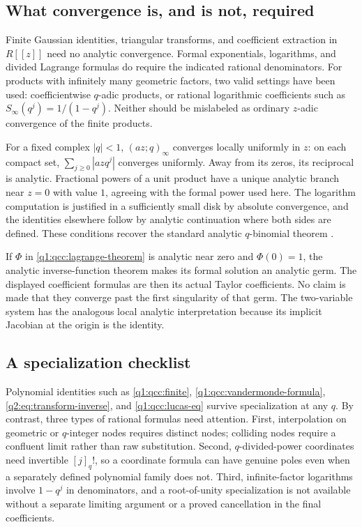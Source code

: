 \documentclass[11pt,a4paper,oneside,openany]{book}
\theoremstyle{definition}
\theoremstyle{remark}
\newcommand{\qf}[2][q]{[#2]_{#1}!}
\newcommand{\poch}[3]{(#1;#2)_{#3}}
\begin{document}
\subsection{What convergence is, and is not, required}
Finite Gaussian identities, triangular transforms, and coefficient extraction in
$R[[z]]$ need no analytic convergence. Formal exponentials, logarithms, and divided
Lagrange formulas do require the indicated rational denominators. For products
with infinitely many geometric factors, two valid settings have been used:
coefficientwise $q$-adic products, or rational logarithmic coefficients such as
$S_\infty(q^j)=1/(1-q^j)$. Neither should be mislabeled as ordinary $z$-adic
convergence of the finite products.

For a fixed complex $|q|<1$, $\poch{az}q\infty$ converges locally uniformly in
$z$: on each compact set, $\sum_{j\ge0}|azq^j|$ converges uniformly. Away from its
zeros, its reciprocal is analytic. Fractional powers of a unit product have a
unique analytic branch near $z=0$ with value $1$, agreeing with the formal power
used here. The logarithm computation is justified in a sufficiently small disk
by absolute convergence, and the identities elsewhere follow by analytic
continuation where both sides are defined. These conditions recover the standard
analytic $q$-binomial theorem \cite{dlmf172,dlmf175}.

If $\Phi$ in \cref{q1:qcc:lagrange-theorem} is analytic near zero and $\Phi(0)=1$, the
analytic inverse-function theorem makes its formal solution an analytic germ.
The displayed coefficient formulas are then its actual Taylor coefficients.
No claim is made that they converge past the first singularity of that germ.
The two-variable system has the analogous local analytic interpretation because
its implicit Jacobian at the origin is the identity.

\subsection{A specialization checklist}
Polynomial identities such as \eqref{q1:qcc:finite}, \eqref{q1:qcc:vandermonde-formula},
\eqref{q2:eq:transform-inverse}, and \eqref{q1:qcc:lucas-eq} survive specialization at any
$q$. By contrast, three types of rational formulas need attention.
First, interpolation on geometric or $q$-integer nodes requires distinct nodes;
colliding nodes require a confluent limit rather than raw substitution.
Second, $q$-divided-power coordinates need invertible $\qf j$, so a coordinate
formula can have genuine poles even when a separately defined polynomial family
does not. Third, infinite-factor logarithms involve $1-q^j$ in denominators,
and a root-of-unity specialization is not available without a separate limiting
argument or a proved cancellation in the final coefficients.
\end{document}
